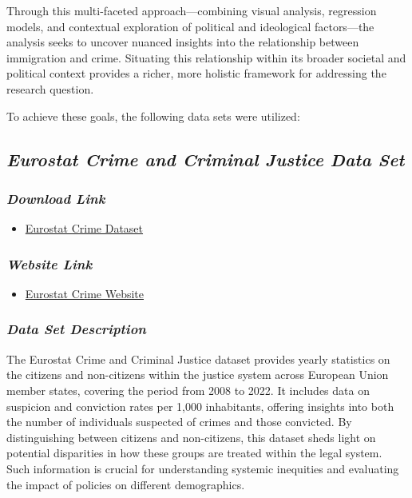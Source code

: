 \documentclass[
]{article}
\providecommand{\tightlist}{%
  \setlength{\itemsep}{0pt}\setlength{\parskip}{0pt}}\usepackage{longtable,booktabs,array}
\begin{document}
Through this multi-faceted approach---combining visual analysis,
regression models, and contextual exploration of political and
ideological factors---the analysis seeks to uncover nuanced insights
into the relationship between immigration and crime. Situating this
relationship within its broader societal and political context provides
a richer, more holistic framework for addressing the research question.

To achieve these goals, the following data sets were utilized:

\subsection{\texorpdfstring{\emph{Eurostat Crime and Criminal Justice
Data
Set}}{Eurostat Crime and Criminal Justice Data Set}}\label{eurostat-crime-and-criminal-justice-data-set}

\subsubsection{\texorpdfstring{\emph{Download
Link}}{Download Link}}\label{download-link}

\begin{itemize}
\tightlist
\item
  \href{https://ec.europa.eu/eurostat/databrowser/view/crim_just_ctz/default/table?lang=en}{Eurostat
  Crime Dataset}
\end{itemize}

\subsubsection{\texorpdfstring{\emph{Website
Link}}{Website Link}}\label{website-link}

\begin{itemize}
\tightlist
\item
  \href{https://ec.europa.eu/eurostat/databrowser/view/crim_just_ctz/default/table?lang=en}{Eurostat
  Crime Website}
\end{itemize}

\subsubsection{\texorpdfstring{\emph{Data Set
Description}}{Data Set Description}}\label{data-set-description}

The Eurostat Crime and Criminal Justice dataset provides yearly
statistics on the citizens and non-citizens within the justice system
across European Union member states, covering the period from 2008 to
2022. It includes data on suspicion and conviction rates per 1,000
inhabitants, offering insights into both the number of individuals
suspected of crimes and those convicted. By distinguishing between
citizens and non-citizens, this dataset sheds light on potential
disparities in how these groups are treated within the legal system.
Such information is crucial for understanding systemic inequities and
evaluating the impact of policies on different demographics.
\end{document}
